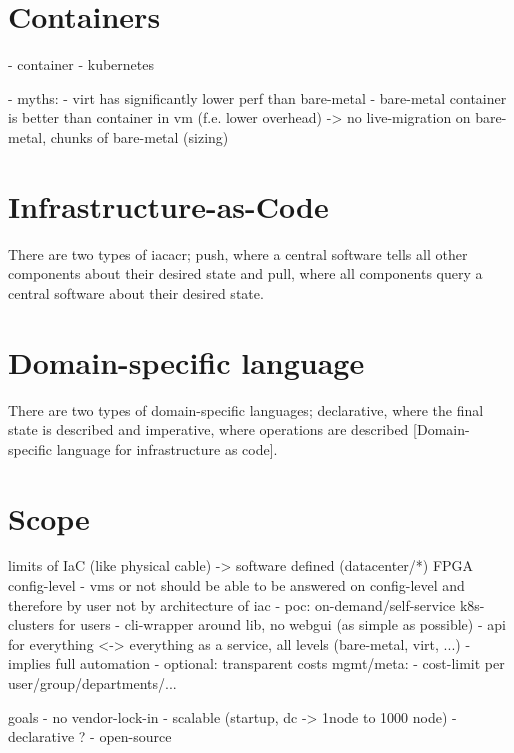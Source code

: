 \section{Containers}
- container
- kubernetes

- myths:
  - virt has significantly lower perf than bare-metal
  - bare-metal container is better than container in vm (f.e. lower overhead) -> no live-migration on bare-metal, chunks of bare-metal (sizing)

\section{Infrastructure-as-Code}
  There are two types of \gls{iacacr}; push, where a central software tells all other components about their desired state and pull, where all components query a central software about their desired state.

\section{Domain-specific language}
  There are two types of domain-specific languages; declarative, where the final state is described and imperative, where operations are described [Domain-specific language for infrastructure as code].

\section{Scope} %
limits of IaC (like physical cable) -> software defined (datacenter/*)
FPGA
config-level
- vms or not should be able to be answered on config-level and therefore by user not by architecture of iac
- poc: on-demand/self-service k8s-clusters for users
  - cli-wrapper around lib, no webgui (as simple as possible)
  - api for everything <-> everything as a service, all levels (bare-metal, virt, ...)
  - implies full automation
  - optional: transparent costs
mgmt/meta:
- cost-limit per user/group/departments/...

goals
- no vendor-lock-in
- scalable (startup, dc -> 1node to 1000 node)
- declarative ?
- open-source
